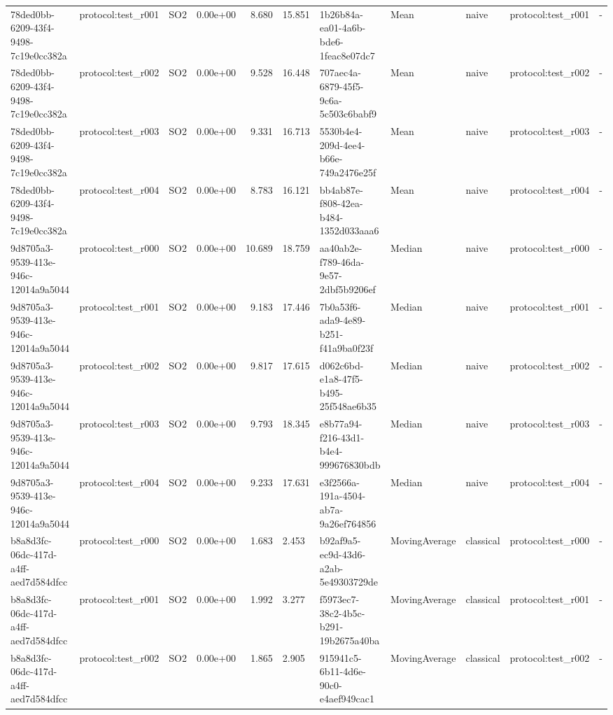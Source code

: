 \begin{table}[htbp]
\begin{tabular}{llrrr}
78ded0bb-6209-43f4-9498-7c19e0cc382a & protocol:test\_r001 & SO2 & 0.00e+00 & 8.680 & 15.851 & 1b26b84a-ea01-4a6b-bde6-1feac8e07dc7 & Mean & naive & protocol:test\_r001 & - \\
78ded0bb-6209-43f4-9498-7c19e0cc382a & protocol:test\_r002 & SO2 & 0.00e+00 & 9.528 & 16.448 & 707aec4a-6879-45f5-9c6a-5c503c6babf9 & Mean & naive & protocol:test\_r002 & - \\
78ded0bb-6209-43f4-9498-7c19e0cc382a & protocol:test\_r003 & SO2 & 0.00e+00 & 9.331 & 16.713 & 5530b4e4-209d-4ee4-b66e-749a2476e25f & Mean & naive & protocol:test\_r003 & - \\
78ded0bb-6209-43f4-9498-7c19e0cc382a & protocol:test\_r004 & SO2 & 0.00e+00 & 8.783 & 16.121 & bb4ab87e-f808-42ea-b484-1352d033aaa6 & Mean & naive & protocol:test\_r004 & - \\
9d8705a3-9539-413e-946c-12014a9a5044 & protocol:test\_r000 & SO2 & 0.00e+00 & 10.689 & 18.759 & aa40ab2e-f789-46da-9e57-2dbf5b9206ef & Median & naive & protocol:test\_r000 & - \\
9d8705a3-9539-413e-946c-12014a9a5044 & protocol:test\_r001 & SO2 & 0.00e+00 & 9.183 & 17.446 & 7b0a53f6-ada9-4e89-b251-f41a9ba0f23f & Median & naive & protocol:test\_r001 & - \\
9d8705a3-9539-413e-946c-12014a9a5044 & protocol:test\_r002 & SO2 & 0.00e+00 & 9.817 & 17.615 & d062c6bd-e1a8-47f5-b495-25f548ae6b35 & Median & naive & protocol:test\_r002 & - \\
9d8705a3-9539-413e-946c-12014a9a5044 & protocol:test\_r003 & SO2 & 0.00e+00 & 9.793 & 18.345 & e8b77a94-f216-43d1-b4e4-999676830bdb & Median & naive & protocol:test\_r003 & - \\
9d8705a3-9539-413e-946c-12014a9a5044 & protocol:test\_r004 & SO2 & 0.00e+00 & 9.233 & 17.631 & e3f2566a-191a-4504-ab7a-9a26ef764856 & Median & naive & protocol:test\_r004 & - \\
b8a8d3fc-06dc-417d-a4ff-aed7d584dfcc & protocol:test\_r000 & SO2 & 0.00e+00 & 1.683 & 2.453 & b92af9a5-ec9d-43d6-a2ab-5e49303729de & MovingAverage & classical & protocol:test\_r000 & - \\
b8a8d3fc-06dc-417d-a4ff-aed7d584dfcc & protocol:test\_r001 & SO2 & 0.00e+00 & 1.992 & 3.277 & f5973ec7-38c2-4b5c-b291-19b2675a40ba & MovingAverage & classical & protocol:test\_r001 & - \\
b8a8d3fc-06dc-417d-a4ff-aed7d584dfcc & protocol:test\_r002 & SO2 & 0.00e+00 & 1.865 & 2.905 & 915941c5-6b11-4d6e-90c0-e4aef949cac1 & MovingAverage & classical & protocol:test\_r002 & - \\

\end{tabular}
\end{table}
